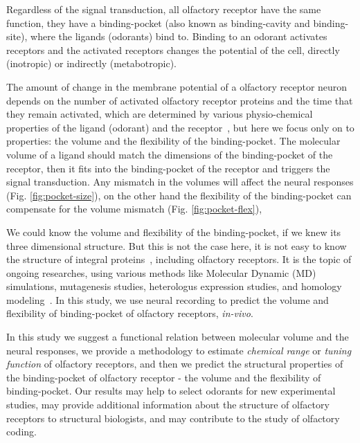 \documentclass[11pt]{article} %
\begin{document}
Regardless of the signal transduction, 
all olfactory receptor have the same function, they have a binding-pocket (also known as binding-cavity and binding-site),
where the ligands (odorants) bind to. 
Binding to an odorant activates receptors and 
the activated receptors changes the potential of the cell, 
directly (inotropic) or indirectly (metabotropic).

The amount of change in the membrane potential of a olfactory receptor neuron depends on the number of activated olfactory receptor proteins and the time that they remain activated,
which are determined by various physio-chemical properties of the ligand (odorant) and the receptor~\cite{Turin,Araneda2000,Gabler2013,guerrieri2005,uchida2000}, 
but here we focus only on to properties: the volume and the flexibility of the binding-pocket.
The molecular volume of a ligand should match the dimensions of the binding-pocket of the receptor,
then it fits into the binding-pocket of the receptor and triggers the signal transduction. 
Any mismatch in the volumes will affect the neural responses (Fig. \ref{fig:pocket-size}), 
on the other hand the flexibility of the binding-pocket can compensate for the volume mismatch (Fig. \ref{fig:pocket-flex}),

We could know the volume and flexibility of the binding-pocket, 
if we knew its three dimensional structure.
But this is not the case here, 
it is not easy to know the structure of integral proteins~\cite{Zhang2008,Lupieri2009}, 
including olfactory receptors. 
It is the topic of ongoing researches, 
using various methods like Molecular Dynamic (MD) simulations, 
mutagenesis studies, heterologus expression studies, and homology modeling~\cite{Khafizov2007,Man2004,Lai2005,Vaidehi2002,Floriano2004,Schmiedeberg2007,Katada2005,Kato2008,Rospars2013}.
In this study, we use neural recording to predict the volume and flexibility of binding-pocket of olfactory receptors, {\it in-vivo}.

In this study we suggest a functional relation between molecular volume and the neural responses, 
we provide a methodology to estimate {\it chemical range} or {\it tuning function} of olfactory receptors,
and then we predict the structural properties of the binding-pocket of olfactory receptor - the volume and the flexibility of binding-pocket.
Our results may help to select odorants  for new experimental studies, 
may provide additional information about the structure of olfactory receptors to structural biologists, 
and may contribute to the study of olfactory coding.
\end{document}
